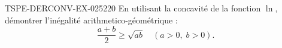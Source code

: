 \begin{exercice}{TSPE-DERCONV-EX-025}{2}{20}
En utilisant la concavité de la fonction $\ln$, démontrer l'inégalité arithmetico-géométrique :
\[ \frac{a+b}{2} \geq \sqrt{ab} \quad (a > 0,\; b > 0). \]

\end{exercice}
